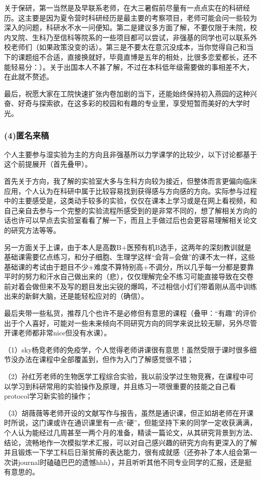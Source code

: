 \documentclass[11pt,oneside]{book}
\begin{document}
关于保研，第一当然是及早联系老师，在大三暑假前尽量有一点点实在的科研经历。这主要是因为夏令营时科研经历是最主要的考察项目，老师可能会问一些较为深入的问题，科研水不水一问便知。第二是建议多方面了解，不要仅限于未院，校内叉院、生科乃至信科等院系的一些项目都可以尝试，非强基的同学也可以联系外校老师们（如果政策没变的话）。第三是不要太在意沉没成本，当你觉得自己和当下的课题组不合适，直接换就好，毕竟直博是五年的相处，比很多恋爱都长，还不能轻易分：）。关于出国本人不甚了解，不过在本科低年级需要做的事相差不大，在此就不赘述。

最后，祝愿大家在工院快速扩张内卷加剧的当下，还能始终保持初入燕园的这种兴奋、好奇与探索欲，在这多彩的校园和有趣的专业里，享受短暂而美好的大学时光。

\subsubsection{(4)匿名来稿}

个人主要参与湿实验为主的方向且非强基所以力学课学的比较少，以下讨论都基于这个前提展开（首先叠甲）。

首先关于方向，我了解的实验室大多与生科方向较为接近，但整体而言更偏向临床应用，个人认为在科研中属于比较容易找到获得感与方向感的方向。实际参与过程中的主要感受是，这类动手较多的实验，仅仅在课本上学习或是在网上看视频，和自己亲自去参与一个完整的实验流程所感受到的是非常不同的，想了解相关方向的话也许可以早点去实验室看看了解一下，而且上手做过后也会更容易理解相关论文的研究方法等等。

另一方面关于上课，由于本人是高数B+医预有机B选手，这两年的深刻教训就是基础课需要亿点练习，和分子细胞、生理学这样“会背=会做”的课不太一样，这些基础课的考试由于题目不少+难度不算特别高+不调分，所以几乎每一分都是要靠平时的努力和汗水自己做出来的（悲），仅仅理解完全不练习可能直接导致在交卷前对着会做但来不及写的题目发出尖锐的爆鸣，不过相信小灯们带着刚从高中训练出来的新鲜大脑，还是能轻松应对的（确信）。

最后夹带一些私货，推荐几个也许不是必修但有意思的课程（叠甲：“有趣”的评价出于个人喜好，可能对一些未来倾向不同研究方向的同学来说比较无聊，另外尽管开课老师都非常nice但没有水课）。

（1）sky杨竞老师的免疫学，个人觉得老师讲课很有意思！虽然受限于课时很多细节没办法在课程中全部覆盖到，但作为入门了解感觉很不错；

（2）孙红芳老师的生物医学工程综合实验，我以前没学过生物竞赛，在课程中可以学习到科研常用的实验操作及原理，并且练习一项很重要的技能之自己看protocol学习新实验的操作；

（3）胡薇薇等老师开设的文献写作与报告，虽然是通识课，但正如胡老师在开课时所说，这门课或许在通识课里有一点“硬”，但能坚持下来的同学一定收获满满，个人认为能经过几周甚至一两个月的准备，精读一篇论文，从其研究背景到方法、结论，流畅地作一次模拟学术汇报，可以对自己感兴趣的研究方向有更深入的了解并且锻炼一下学工科后日渐贫瘠的表达能力，很有成就感（还弥补了本人组会第一次讲journal时磕磕巴巴的遗憾hhh），并且听听其他不同专业同学的汇报，还是挺有意思的。
\end{document}

